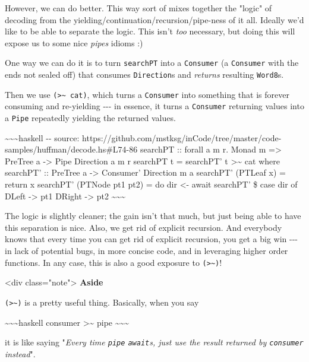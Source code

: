 \documentclass[]{article}
\begin{document}
However, we can do better. This way sort of mixes together the "logic" of
decoding from the yielding/continuation/recursion/pipe-ness of it all. Ideally
we'd like to be able to separate the logic. This isn't \emph{too} necessary, but
doing this will expose us to some nice \emph{pipes} idioms :)

One way we can do it is to turn \texttt{searchPT} into a
\texttt{Consumer\textquotesingle{}} (a \texttt{Consumer} with the ends not
sealed off) that consumes \texttt{Direction}s and \emph{returns} resulting
\texttt{Word8}s.

Then we use \texttt{(\textgreater{}\textasciitilde{}\ cat)}, which turns a
\texttt{Consumer\textquotesingle{}} into something that is forever consuming and
re-yielding -\/-\/- in essence, it turns a \texttt{Consumer\textquotesingle{}}
returning values into a \texttt{Pipe} repeatedly yielding the returned values.

\textasciitilde{}\textasciitilde{}\textasciitilde{}haskell -\/- source:
https://github.com/mstksg/inCode/tree/master/code-samples/huffman/decode.hs\#L74-86
searchPT :: forall a m r. Monad m =\textgreater{} PreTree a -\textgreater{} Pipe
Direction a m r searchPT t = searchPT' t \textgreater{}\textasciitilde{} cat
where searchPT' :: PreTree a -\textgreater{} Consumer' Direction m a searchPT'
(PTLeaf x) = return x searchPT' (PTNode pt1 pt2) = do dir \textless{}- await
searchPT' \$ case dir of DLeft -\textgreater{} pt1 DRight -\textgreater{} pt2
\textasciitilde{}\textasciitilde{}\textasciitilde{}

The logic is slightly cleaner; the gain isn't that much, but just being able to
have this separation is nice. Also, we get rid of explicit recursion. And
everybody knows that every time you can get rid of explicit recursion, you get a
big win -\/-\/- in lack of potential bugs, in more concise code, and in
leveraging higher order functions. In any case, this is also a good exposure to
\texttt{(\textgreater{}\textasciitilde{})}!

\textless{}div class="note"\textgreater{} \textbf{Aside}

\texttt{(\textgreater{}\textasciitilde{})} is a pretty useful thing. Basically,
when you say

\textasciitilde{}\textasciitilde{}\textasciitilde{}haskell consumer
\textgreater{}\textasciitilde{} pipe
\textasciitilde{}\textasciitilde{}\textasciitilde{}

it is like saying "\emph{Every time \texttt{pipe} \texttt{await}s, just use the
result returned by \texttt{consumer} instead}".
\end{document}
